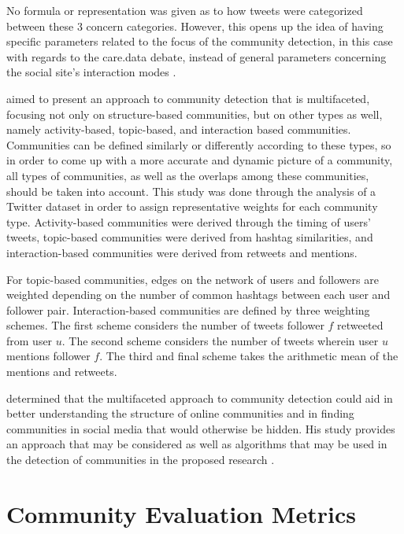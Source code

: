 No formula or representation was given as to how tweets were categorized between these 3 concern categories. However, this opens up the idea of having specific parameters related to the focus of the community detection, in this case with regards to the care.data debate, instead of general parameters concerning the social site’s interaction modes \cite{Amor:2015}.

 aimed to present an approach to community detection that is multifaceted, focusing not only on structure-based communities, but on other types as well, namely activity-based, topic-based, and interaction based communities. Communities can be defined similarly or differently according to these types, so in order to come up with a more accurate and dynamic picture of a community, all types of communities, as well as the overlaps among these communities, should be taken into account. This study was done through the analysis of a Twitter dataset in order to assign representative weights for each community type. Activity-based communities were derived through the timing of users' tweets, topic-based communities were derived from hashtag similarities, and interaction-based communities were derived from retweets and mentions. 

For topic-based communities, edges on the network of users and followers are weighted depending on the number of common hashtags between each user and follower pair. Interaction-based communities are defined by three weighting schemes. The first scheme considers the number of tweets follower $f$ retweeted from user $u$. The second scheme considers the number of tweets wherein user $u$ mentions follower $f$. The third and final scheme takes the arithmetic mean of the mentions and retweets.

 determined that the multifaceted approach to community detection could aid in better understanding the structure of online communities and in finding communities in social media that would otherwise be hidden. His study provides an approach that may be considered as well as algorithms that may be used in the detection of communities in the proposed research \cite{Darmon:2015}.

\section{Community Evaluation Metrics}


